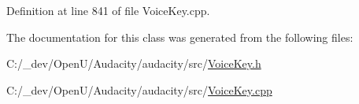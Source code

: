 Definition at line 841 of file Voice\+Key.\+cpp.



The documentation for this class was generated from the following files\+:\begin{DoxyCompactItemize}
\item 
C\+:/\+\_\+dev/\+Open\+U/\+Audacity/audacity/src/\hyperlink{_voice_key_8h}{Voice\+Key.\+h}\item 
C\+:/\+\_\+dev/\+Open\+U/\+Audacity/audacity/src/\hyperlink{_voice_key_8cpp}{Voice\+Key.\+cpp}\end{DoxyCompactItemize}
